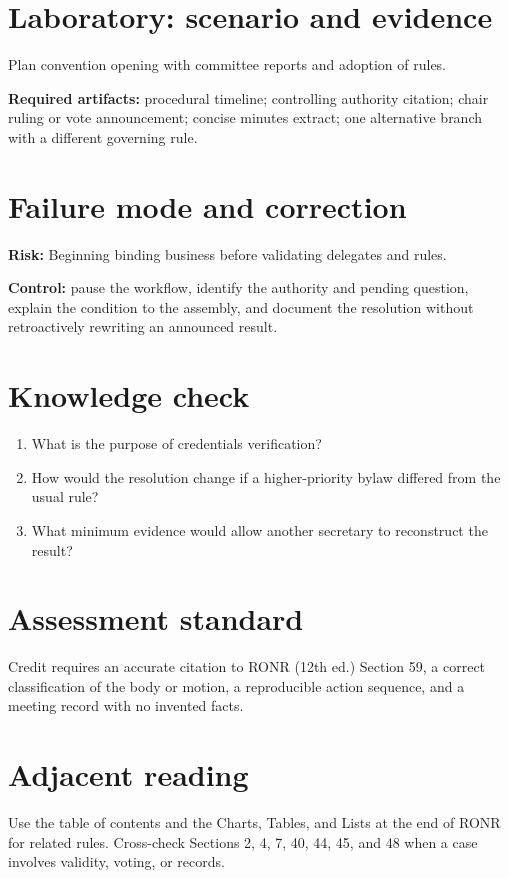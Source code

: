 \documentclass[11pt]{article}
\begin{document}
\section{Laboratory: scenario and evidence}
Plan convention opening with committee reports and adoption of rules.

\textbf{Required artifacts:} procedural timeline; controlling authority citation; chair ruling or vote announcement; concise minutes extract; one alternative branch with a different governing rule.

\section{Failure mode and correction}
\textbf{Risk:} Beginning binding business before validating delegates and rules.

\textbf{Control:} pause the workflow, identify the authority and pending question, explain the condition to the assembly, and document the resolution without retroactively rewriting an announced result.

\section{Knowledge check}
\begin{enumerate}[leftmargin=*,itemsep=4pt]
\item What is the purpose of credentials verification?
\item How would the resolution change if a higher-priority bylaw differed from the usual rule?
\item What minimum evidence would allow another secretary to reconstruct the result?
\end{enumerate}

\section{Assessment standard}
Credit requires an accurate citation to RONR (12th ed.) Section 59, a correct classification of the body or motion, a reproducible action sequence, and a meeting record with no invented facts.

\section{Adjacent reading}
Use the table of contents and the Charts, Tables, and Lists at the end of RONR for related rules. Cross-check Sections 2, 4, 7, 40, 44, 45, and 48 when a case involves validity, voting, or records.
\end{document}
